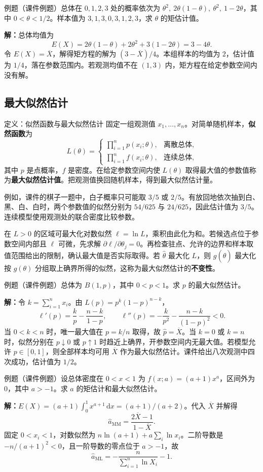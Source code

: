 \documentclass[UTF8,fontset=none,zihao=-4,a4paper]{ctexart}
\newcommand{\term}[1]{\textbf{#1}}
\newcommand{\example}[1]{\begin{infobox}{例题}#1\end{infobox}}
\newcommand{\solution}{\par\noindent\textbf{解：}}
\begin{document}
\example{（课件例题）总体在 $0,1,2,3$ 处的概率依次为 $\theta^2,\ 2\theta(1-\theta),\ \theta^2,\ 1-2\theta$，其中 $0<\theta<1/2$。样本值为 $3,1,3,0,3,1,2,3$，求 $\theta$ 的矩估计值。}
\solution 总体均值为
\[
E(X)=2\theta(1-\theta)+2\theta^2+3(1-2\theta)=3-4\theta.
\]
令 $E(X)=\overline X$，解得矩方程的解为 $(3-\overline X)/4$。本组样本的均值为 $2$，估计值为 $1/4$，落在参数范围内。若观测均值不在 $(1,3)$ 内，矩方程在给定参数空间内没有解。

\subsection{最大似然估计}
\begin{infobox}{定义：似然函数与最大似然估计}
固定一组观测值 $x_1,\ldots,x_n$。对简单随机样本，\term{似然函数}为
\[
L(\theta)=
\begin{cases}
\displaystyle\prod_{i=1}^n p(x_i;\theta), & \text{离散总体},\\
\displaystyle\prod_{i=1}^n f(x_i;\theta), & \text{连续总体},
\end{cases}
\]
其中 $p$ 是点概率，$f$ 是密度。在给定参数空间内使 $L(\theta)$ 取得最大值的参数值称为\term{最大似然估计值}。把观测值换回随机样本，得到最大似然估计量。
\end{infobox}
例如，课件的棋子一题中，白子概率只可能取 $3/5$ 或 $2/5$。有放回地依次抽到白、黑、白、白时，两个参数值的似然分别为 $54/625$ 与 $24/625$，因此估计值为 $3/5$。连续模型使用观测处的联合密度比较参数。

在 $L>0$ 的区域可最大化对数似然 $\ell=\ln L$，乘积由此化为和。若候选点位于参数空间内部且 $\ell$ 可微，先求解 $\partial\ell/\partial\theta_j=0$。再检查驻点、允许的边界和样本取值范围给出的限制，确认最大值是否实际取得。若 $\widehat\theta$ 最大化 $L$，则 $g(\widehat\theta)$ 最大化按 $g(\theta)$ 分组取上确界所得的似然，这称为最大似然估计的\term{不变性}。

\example{（课件例题）总体为 $B(1,p)$，其中 $0<p<1$。求 $p$ 的最大似然估计。}
\solution 令 $k=\sum_{i=1}^n x_i$。由 $L(p)=p^k(1-p)^{n-k}$，
\[
\ell'(p)=\frac{k}{p}-\frac{n-k}{1-p},\qquad
\ell''(p)=-\frac{k}{p^2}-\frac{n-k}{(1-p)^2}<0.
\]
当 $0<k<n$ 时，唯一最大值在 $p=k/n$ 取得，故 $\widehat p=\overline X$。当 $k=0$ 或 $k=n$ 时，似然分别在 $p\downarrow0$ 或 $p\uparrow1$ 时趋近上确界，开参数空间内无最大值。若模型允许 $p\in[0,1]$，则全部样本均可用 $\overline X$ 作为最大似然估计。课件给出八次观测中四次成功，估计值为 $1/2$。

\example{（课件例题）设总体密度在 $0<x<1$ 为 $f(x;a)=(a+1)x^a$，区间外为 $0$，其中 $a>-1$。求 $a$ 的矩估计和最大似然估计。}
\solution $E(X)=(a+1)\int_0^1 x^{a+1}\,\mathrm dx=(a+1)/(a+2)$。代入 $\overline X$ 并解得
\[
\widehat a_{\mathrm{MM}}=\frac{2\overline X-1}{1-\overline X}.
\]
固定 $0<x_i<1$，对数似然为 $n\ln(a+1)+a\sum_i\ln x_i$。二阶导数是 $-n/(a+1)^2<0$，且一阶导数的零点位于 $a>-1$，故
\[
\widehat a_{\mathrm{ML}}=-\frac{n}{\sum_{i=1}^n\ln X_i}-1.
\]
\end{document}
